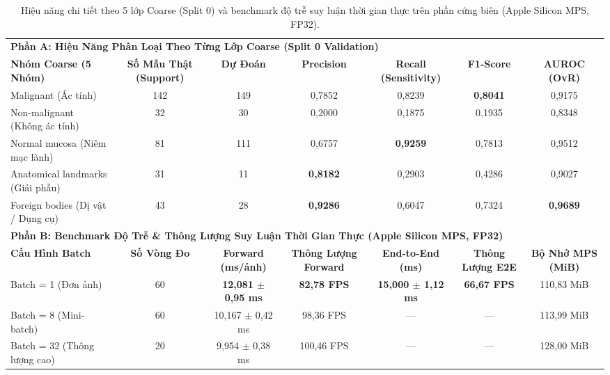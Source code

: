 \begin{table}[t]
\centering
\small
\caption{Hiệu năng chi tiết theo 5 lớp Coarse (Split 0) và benchmark độ trễ suy luận thời gian thực trên phần cứng biên (Apple Silicon MPS, FP32).}
\label{tab:per_class_and_runtime}
\begin{adjustbox}{width=\textwidth}
\begin{tabular}{lcccccc}
\toprule
\multicolumn{7}{l}{\textbf{Phần A: Hiệu Năng Phân Loại Theo Từng Lớp Coarse (Split 0 Validation)}} \\
\textbf{Nhóm Coarse (5 Nhóm)} & \textbf{Số Mẫu Thật (Support)} & \textbf{Dự Đoán} & \textbf{Precision} & \textbf{Recall (Sensitivity)} & \textbf{F1-Score} & \textbf{AUROC (OvR)} \\
\midrule
Malignant (Ác tính) & 142 & 149 & 0,7852 & 0,8239 & \textbf{0,8041} & 0,9175 \\
Non-malignant (Không ác tính) & 32 & 30 & 0,2000 & 0,1875 & 0,1935 & 0,8348 \\
Normal mucosa (Niêm mạc lành) & 81 & 111 & 0,6757 & \textbf{0,9259} & 0,7813 & 0,9512 \\
Anatomical landmarks (Giải phẫu) & 31 & 11 & \textbf{0,8182} & 0,2903 & 0,4286 & 0,9027 \\
Foreign bodies (Dị vật / Dụng cụ) & 43 & 28 & \textbf{0,9286} & 0,6047 & 0,7324 & \textbf{0,9689} \\
\midrule
\multicolumn{7}{l}{\textbf{Phần B: Benchmark Độ Trễ \& Thông Lượng Suy Luận Thời Gian Thực (Apple Silicon MPS, FP32)}} \\
\textbf{Cấu Hình Batch} & \textbf{Số Vòng Đo} & \textbf{Forward (ms/ảnh)} & \textbf{Thông Lượng Forward} & \textbf{End-to-End (ms)} & \textbf{Thông Lượng E2E} & \textbf{Bộ Nhớ MPS (MiB)} \\
\midrule
Batch = 1 (Đơn ảnh) & 60 & \textbf{12,081 $\pm$ 0,95 ms} & \textbf{82,78 FPS} & \textbf{15,000 $\pm$ 1,12 ms} & \textbf{66,67 FPS} & 110,83 MiB \\
Batch = 8 (Mini-batch) & 60 & 10,167 $\pm$ 0,42 ms & 98,36 FPS & --- & --- & 113,99 MiB \\
Batch = 32 (Thông lượng cao) & 20 & 9,954 $\pm$ 0,38 ms & 100,46 FPS & --- & --- & 128,00 MiB \\
\bottomrule
\end{tabular}
\end{adjustbox}
\end{table}
